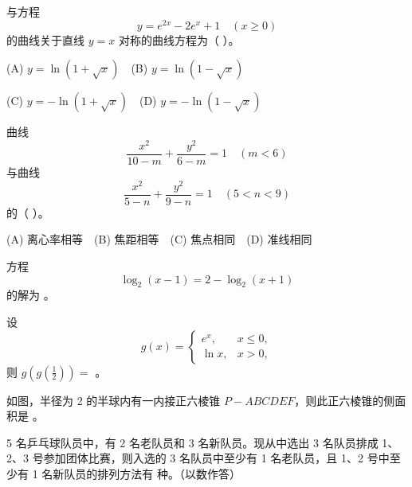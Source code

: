 \begin{question}
与方程
\nopagebreak[4]
\[
y=e^{2x}-2e^x+1\quad (x\ge 0)
\]
的曲线关于直线 \(y=x\) 对称的曲线方程为（ ）。

(A) \(y=\ln(1+\sqrt{x})\)　(B) \(y=\ln(1-\sqrt{x})\)

(C) \(y=-\ln(1+\sqrt{x})\)　(D) \(y=-\ln(1-\sqrt{x})\)

\end{question}
\begin{question}
曲线
\nopagebreak[4]
\[
\frac{x^2}{10-m}+\frac{y^2}{6-m}=1\quad(m<6)
\]
与曲线
\nopagebreak[4]
\[
\frac{x^2}{5-n}+\frac{y^2}{9-n}=1\quad(5<n<9)
\]
的（ ）。

(A) 离心率相等　(B) 焦距相等　(C) 焦点相同　(D) 准线相同

\end{question}

\begin{question}
方程
\nopagebreak[4]
\[
\log_2(x-1)=2-\log_2(x+1)
\]
的解为 \gkblank{}。

\end{question}
\begin{question}
设
\nopagebreak[4]
\[
g(x)=\begin{cases}e^x,&x\le 0,\\\ln x,&x>0,\end{cases}
\]
则 \(g\left(g\left(\frac12\right)\right)=\) \gkblank{}。

\Needspace{0.4\textheight}
\end{question}
\begin{question}
如图，半径为 2 的半球内有一内接正六棱锥 \(P-ABCDEF\)，则此正六棱锥的侧面积是 \gkblank{}。
\nopagebreak[4]
\begin{center}\end{center}
\nopagebreak[4]
\end{question}
\begin{question}
5 名乒乓球队员中，有 2 名老队员和 3 名新队员。现从中选出 3 名队员排成 1、2、3 号参加团体比赛，则入选的 3 名队员中至少有 1 名老队员，且 1、2 号中至少有 1 名新队员的排列方法有 \gkblank{} 种。（以数作答）

\end{question}

